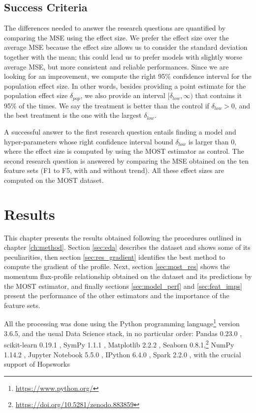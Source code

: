 \documentclass[a4paper,11pt]{kth-mag}
\begin{document}
\section{Success Criteria}
\label{sec:success}
The differences needed to answer the research questions are quantified by comparing the MSE using the effect size. We prefer the effect size over the average MSE because the effect size allows us to consider the standard deviation together with the mean; this could lead us to prefer models with slightly worse average MSE, but more consistent and reliable performances. Since we are looking for an improvement, we compute the right 95\% confidence interval for the population effect size. In other words, besides providing a point estimate for the population effect size $\delta_{pop}$, we also provide an interval $[\delta_{low}, \infty)$ that contains it 95\% of the times. We say the treatment is better than the control if $\delta_{low}>0$, and the best treatment is the one with the largest $\delta_{low}$.

A successful answer to the first research question entails finding a model and hyper-parameters whose right confidence interval bound $\delta_{low}$ is larger than 0, where the effect size is computed by using the MOST estimator as control. The second research question is answered by comparing the MSE obtained on the ten feature sets (F1 to F5, with and without trend). All these effect sizes are computed on the MOST dataset.


\chapter{Results}
\label{ch:results}

This chapter presents the results obtained following the procedures outlined in chapter \ref{ch:method}. Section \ref{sec:eda} describes the dataset and shows some of its peculiarities, then section \ref{sec:res_gradient} identifies the best method to compute the gradient of the profile. Next, section \ref{sec:most_res} shows the momentum flux-profile relationship obtained on the dataset and its predictions by the MOST estimator, and finally sections \ref{sec:model_perf} and \ref{sec:feat_imps} present the performance of the other estimators and the importance of the feature sets.

All the processing was done using the Python programming language\footnote{\url{https://www.python.org/}} version 3.6.5, and the usual Data Science stack, in no particular order: Pandas 0.23.0 \citep{pandas}, scikit-learn 0.19.1 \citep{sklearn}, SymPy 1.1.1 \citep{sympy}, Matplotlib 2.2.2 \citep{matplotlib}, Seaborn 0.8.1,\footnote{\url{https://doi.org/10.5281/zenodo.883859}} NumPy 1.14.2 \citep{numpy}, Jupyter Notebook 5.5.0 \citep{jupyter}, IPython 6.4.0 \citep{ipython}, Spark 2.2.0 \citep{spark}, with the crucial support of Hopsworks \citep{hops}
\end{document}
